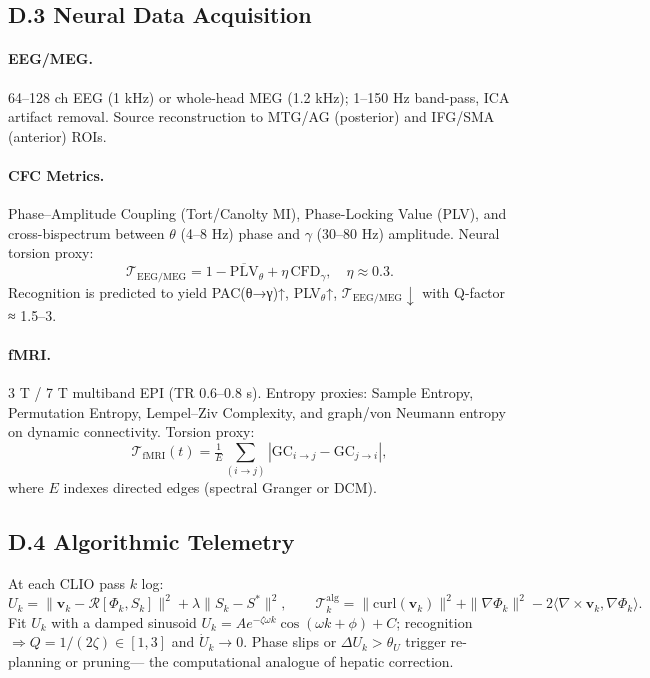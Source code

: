 \documentclass[11pt]{article}
\begin{document}
\subsection*{D.3 Neural Data Acquisition}
\paragraph{EEG/MEG.}
64–128 ch EEG (1 kHz) or whole-head MEG (1.2 kHz); 1–150 Hz band-pass, ICA artifact removal.
Source reconstruction to MTG/AG (posterior) and IFG/SMA (anterior) ROIs.

\paragraph{CFC Metrics.}
Phase–Amplitude Coupling (Tort/Canolty MI), Phase-Locking Value (PLV), and
cross-bispectrum between $\theta$ (4–8 Hz) phase and $\gamma$ (30–80 Hz) amplitude.
Neural torsion proxy:
\[
\mathcal{T}_{\mathrm{EEG/MEG}}
  = 1-\overline{\mathrm{PLV}}_{\theta}
    +\eta\,\mathrm{CFD}_{\gamma},
\quad
\eta\!\approx\!0.3.
\]
Recognition is predicted to yield
PAC(θ→γ)↑, PLV\(_\theta\)↑, $\mathcal{T}_{\mathrm{EEG/MEG}}\!\downarrow$ with
Q-factor ≈ 1.5–3.

\paragraph{fMRI.}
3 T / 7 T multiband EPI (TR 0.6–0.8 s).  
Entropy proxies: Sample Entropy, Permutation Entropy, Lempel–Ziv Complexity,
and graph/von Neumann entropy on dynamic connectivity.
Torsion proxy:
\[
\mathcal{T}_{\mathrm{fMRI}}(t)
 = \tfrac{1}{E}\sum_{(i\to j)}
   |\mathrm{GC}_{i\to j}-\mathrm{GC}_{j\to i}|,
\]
where $E$ indexes directed edges (spectral Granger or DCM).

\subsection*{D.4 Algorithmic Telemetry}
At each CLIO pass $k$ log:
\[
U_k=\|\mathbf{v}_k-\mathcal{R}[\Phi_k,S_k]\|^2
     +\lambda\|S_k-S^\ast\|^2,
\qquad
\mathcal{T}^{\mathrm{alg}}_k
   =\|\mathrm{curl}(\mathbf{v}_k)\|^2
    +\|\nabla\Phi_k\|^2
    -2\langle\nabla\times\mathbf{v}_k,\nabla\Phi_k\rangle.
\]
Fit $U_k$ with a damped sinusoid
$U_k=A e^{-\zeta\omega k}\cos(\omega k+\phi)+C$;
recognition $\Rightarrow Q=1/(2\zeta)\!\in\![1,3]$ and $\dot{U}_k\!\to\!0$.
Phase slips or $\Delta U_k\!>\!\theta_U$ trigger re-planning or pruning—
the computational analogue of hepatic correction.
\end{document}
